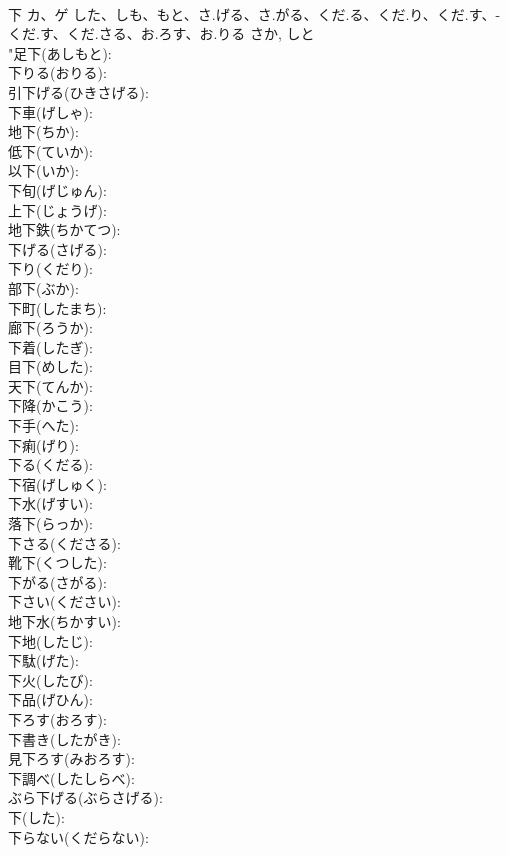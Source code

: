 \documentclass[8pt]{extreport}
\begin{document}
\begin{CJK}{UTF8}{min}
\\	下	カ、ゲ	した、しも、もと、さ.げる、さ.がる、くだ.る、くだ.り、くだ.す、-くだ.す、くだ.さる、お.ろす、お.りる	さか, しと	
\\	"足下(あしもと): 
\\	下りる(おりる): 
\\	引下げる(ひきさげる): 
\\	下車(げしゃ): 
\\	地下(ちか): 
\\	低下(ていか): 
\\	以下(いか): 
\\	下旬(げじゅん): 
\\	上下(じょうげ): 
\\	地下鉄(ちかてつ): 
\\	下げる(さげる): 
\\	下り(くだり): 
\\	部下(ぶか): 
\\	下町(したまち): 
\\	廊下(ろうか): 
\\	下着(したぎ): 
\\	目下(めした): 
\\	天下(てんか): 
\\	下降(かこう): 
\\	下手(へた): 
\\	下痢(げり): 
\\	下る(くだる): 
\\	下宿(げしゅく): 
\\	下水(げすい): 
\\	落下(らっか): 
\\	下さる(くださる): 
\\	靴下(くつした): 
\\	下がる(さがる): 
\\	下さい(ください): 
\\	地下水(ちかすい): 
\\	下地(したじ): 
\\	下駄(げた): 
\\	下火(したび): 
\\	下品(げひん): 
\\	下ろす(おろす): 
\\	下書き(したがき): 
\\	見下ろす(みおろす): 
\\	下調べ(したしらべ): 
\\	ぶら下げる(ぶらさげる): 
\\	下(した): 
\\	下らない(くだらない): 

\end{CJK}
\end{document}
